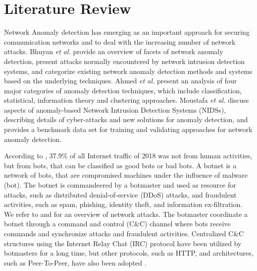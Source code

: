 \documentclass[review]{elsarticle}
\begin{document}
\section{Literature Review}
\label{sec:review}

Network Anomaly detection has emerging as an important approach for securing communication networks and to deal with the increasing number of network attacks. Bhuyan \emph{et al.} \cite{bhuyan2014network} provide an overview of facets of network anomaly detection, present attacks normally encountered by network intrusion detection systems, and categorize existing network anomaly detection methods and systems based on the underlying techniques. Ahmed \emph{et al.} \cite{ahmed2016survey} present an analysis of four major categories of anomaly detection techniques, which include classification, statistical, information theory and clustering approaches. Moustafa \emph{et al.} \cite{moustafa2019holistic} discuss aspects of anomaly-based Network Intrusion Detection Systems (NIDSs), describing details of cyber-attacks and new solutions for anomaly detection, and provides a benchmark data set for training and validating approaches for network anomaly detection.

According to \cite{distilnetworks2019}, 37.9\% of all Internet traffic of 2018 was not from human activities, but from bots, that can be classified as good bots or bad bots. A botnet is a network of bots, that are compromised machines under the influence of malware (bot). The botnet is commandeered by a botmaster and used as resource for attacks, such as distributed denial-of-service (DDoS) attacks, and fraudulent activities, such as spam, phishing, identity theft, and information ex-filtration. We refer to \cite{ahmed2016survey} and \cite{moustafa2019holistic} for an overview of network attacks. The botmaster coordinate a botnet through a command and control (C\&C) channel where bots receive commands and synchronize attacks and fraudulent activities. Centralized C\&C structures using the Internet Relay Chat (IRC) protocol have been utilized by botmasters for a long time, but other protocols, such as HTTP, and architectures, such as Peer-To-Peer, have also been adopted \cite{gu2008botminer}.
\end{document}
